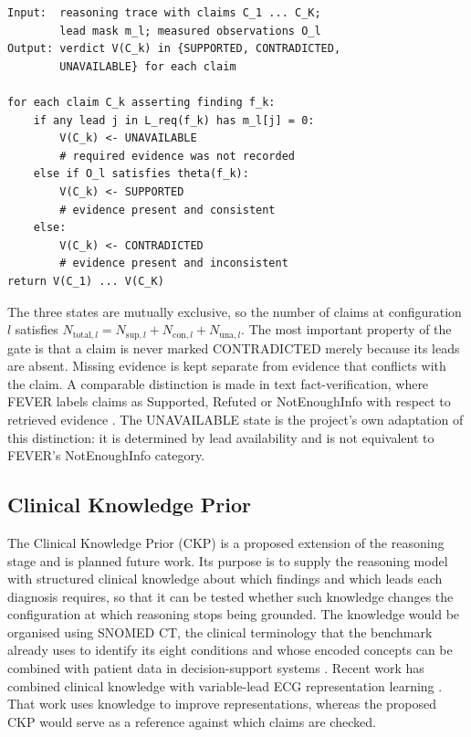 \begin{algorithm}[htbp]
\caption{Grounding Gate (specified, not yet implemented)}
\label{alg:grounding_gate}
\footnotesize
\begin{verbatim}
Input:  reasoning trace with claims C_1 ... C_K;
        lead mask m_l; measured observations O_l
Output: verdict V(C_k) in {SUPPORTED, CONTRADICTED,
        UNAVAILABLE} for each claim

for each claim C_k asserting finding f_k:
    if any lead j in L_req(f_k) has m_l[j] = 0:
        V(C_k) <- UNAVAILABLE
        # required evidence was not recorded
    else if O_l satisfies theta(f_k):
        V(C_k) <- SUPPORTED
        # evidence present and consistent
    else:
        V(C_k) <- CONTRADICTED
        # evidence present and inconsistent
return V(C_1) ... V(C_K)
\end{verbatim}
\normalsize
\end{algorithm}

The three states are mutually exclusive, so the number of claims at configuration $l$ satisfies $N_{\text{total},l} = N_{\text{sup},l} + N_{\text{con},l} + N_{\text{una},l}$. The most important property of the gate is that a claim is never marked CONTRADICTED merely because its leads are absent. Missing evidence is kept separate from evidence that conflicts with the claim. A comparable distinction is made in text fact-verification, where FEVER labels claims as Supported, Refuted or NotEnoughInfo with respect to retrieved evidence \cite{THORNE2018FEVER}. The UNAVAILABLE state is the project's own adaptation of this distinction: it is determined by lead availability and is not equivalent to FEVER's NotEnoughInfo category.

\subsection{Clinical Knowledge Prior}
The Clinical Knowledge Prior (CKP) is a proposed extension of the reasoning stage and is planned future work. Its purpose is to supply the reasoning model with structured clinical knowledge about which findings and which leads each diagnosis requires, so that it can be tested whether such knowledge changes the configuration at which reasoning stops being grounded. The knowledge would be organised using SNOMED CT, the clinical terminology that the benchmark already uses to identify its eight conditions and whose encoded concepts can be combined with patient data in decision-support systems \cite{SNOMED2026CDSGUIDE}. Recent work has combined clinical knowledge with variable-lead ECG representation learning \cite{LIU2025ARBITRARY}. That work uses knowledge to improve representations, whereas the proposed CKP would serve as a reference against which claims are checked.

